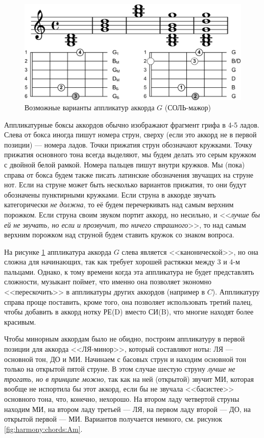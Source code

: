 \begin{figure}[!ht]
    \centering
    \includegraphics{fig/chords/G-variants} 
    \caption{Возможные варианты аппликатур аккорда $G$ (СОЛЬ-мажор)}\label{fig:harmony:chords:G-variants}
\end{figure} 

Аппликатурные боксы аккордов обычно изображают фрагмент грифа в 4-5 ладов. Слева от бокса иногда пишут номера струн, сверху (если это аккорд не в первой позиции) --- номера ладов. Точки прижатия струн обозначают кружками. Точку прижатия основного тона всегда выделяют, мы будем делать это серым кружком с двойной белой рамкой. Номера пальцев пишут  внутри кружков. Мы (пока) справа от бокса будем также писать латинские обозначения звучащих на струне нот. Если на струне может быть несколько вариантов прижатия, то они будут обозначены пунктирными кружками. Если струна в аккорде звучать категорически \emph{не должна}, то её будем перечеркивать над самым верхним порожком. Если струна своим звуком портит аккорд, но несильно, и <<\emph{лучше бы ей не звучать, но если и прозвучит, то ничего страшного}>>, то над самым верхним порожком над струной будем ставить кружок со знаком вопроса.

На рисунке \ref{fig:harmony:chords:G-variants} аппликатура аккорда $G$ слева является <<канонической>>, но она сложна для начинающих, так как требует хорошей растяжки между 3 и 4-м пальцами. Однако, к тому времени когда эта аппликатура не будет представлять сложности, музыкант поймет, что именно она позволяет экономно <<перескочить>> в аппликатуры других аккордов (например в $C$). Аппликатуру справа проще поставить, кроме того, она позволяет использовать третий палец, чтобы добавить в аккорд нотку РЕ(D) вместо СИ(B), что многие находят более красивым.

Чтобы минорным аккордам было не обидно, построим аппликатуру в первой позиции для аккорда <<ЛЯ-минор>>, который составляют ноты: ЛЯ --- основной тон, ДО и МИ. Начинаем с басовых струн и находим основной тон только на открытой пятой струне. В этом случае шестую струну \emph{лучше не трогать, но в принципе можно}, так как на ней (открытой) звучит МИ, которая вообще не испортила бы этот аккорд, если бы не звучала <<басистее>> основного тона, что, конечно, нехорошо. На втором ладу четвертой струны находим МИ, на втором ладу третьей --- ЛЯ, на первом ладу второй --- ДО, на открытой первой --- МИ. Вариантов получается немного, см. рисунок \ref{fig:harmony:chords:Am}. 

